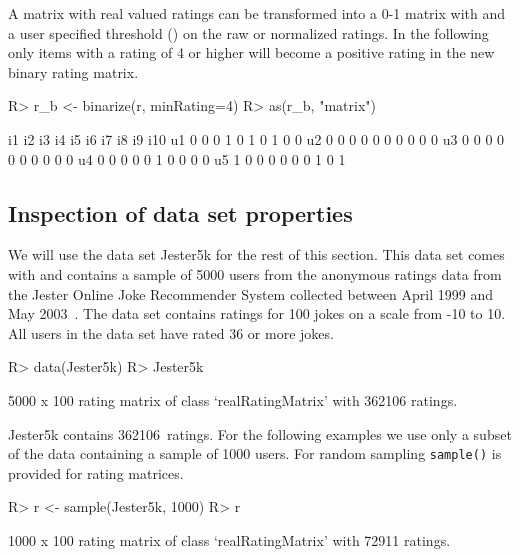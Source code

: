 \documentclass[nojss]{jss}
\newcommand{\func}[1]{\mbox{\texttt{#1()}}}
\begin{document}
A matrix with real valued ratings can be transformed into a 0-1 matrix 
with  and
a user specified threshold () 
on the raw or normalized ratings. In the following only 
items with a rating of 4 or higher will become a positive
rating in the new binary rating matrix.
\begin{Schunk}
\begin{Sinput}
R> r_b <- binarize(r, minRating=4)
R> as(r_b, "matrix")
\end{Sinput}
\begin{Soutput}
   i1 i2 i3 i4 i5 i6 i7 i8 i9 i10
u1  0  0  0  1  0  1  0  1  0   0
u2  0  0  0  0  0  0  0  0  0   0
u3  0  0  0  0  0  0  0  0  0   0
u4  0  0  0  0  0  1  0  0  0   0
u5  1  0  0  0  0  0  0  1  0   1
\end{Soutput}
\end{Schunk}


\subsection{Inspection of data set properties}
We will use the data set Jester5k for the rest of this section.  This data set
comes with  and contains a sample of 5000 users from the
anonymous ratings data from the Jester Online Joke Recommender System collected
between April 1999 and May 2003~\citep{recommender:Goldberg:2001}. The
data set contains ratings for 100 jokes on a scale from -10 to 10. All
users in the data set have rated 36 or more jokes.

\begin{Schunk}
\begin{Sinput}
R> data(Jester5k)
R> Jester5k
\end{Sinput}
\begin{Soutput}
5000 x 100 rating matrix of class ‘realRatingMatrix’ with 362106 ratings.
\end{Soutput}
\end{Schunk}

Jester5k contains 
362106~ratings. For the following examples we use
only a subset of the data containing a sample of 1000 users.
For random sampling \func{sample} is provided for rating matrices.

\begin{Schunk}
\begin{Sinput}
R> r <- sample(Jester5k, 1000) 
R> r
\end{Sinput}
\begin{Soutput}
1000 x 100 rating matrix of class ‘realRatingMatrix’ with 72911 ratings.
\end{Soutput}
\end{Schunk}
\end{document}

